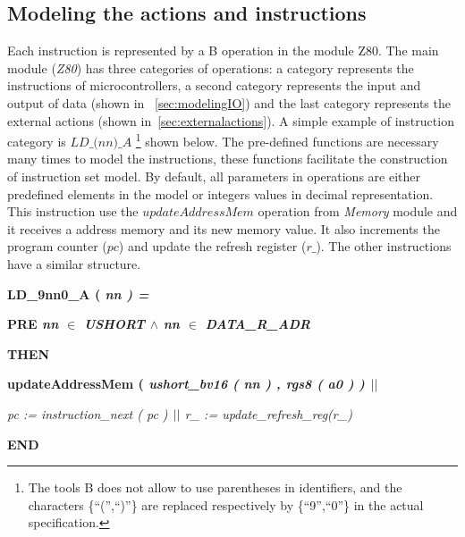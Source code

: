 \documentclass[a4paper]{llncs}
\newcommand{\footnoteremember}[2]{
  \footnote{#2}
  \newcounter{#1}
  \setcounter{#1}{\value{footnote}}
}
\begin{document}
\subsection{Modeling the actions and instructions}

Each instruction is represented by a B operation in the module Z80. The main
module (\textit{Z80}) has three categories of operations: a category represents the 
instructions of microcontrollers, a second category represents the input and output of data 
(shown in ~\ref{sec:modelingIO}) and the last category represents the external
actions (shown in~\ref{sec:externalactions}). A simple example of instruction category is
$\textit{LD\_(nn)\_A}$\footnoteremember{myfootnote}{The tools B does not allow
to use parentheses in identifiers, and the characters \{``('',``)''\} are
replaced respectively by \{``9'',``0''\} in the actual specification.} shown below. The
pre-defined functions are necessary many times to model the instructions, these
functions facilitate the construction of instruction set model. By default, all
parameters in operations are either predefined elements in the model or
integers values in decimal representation. This instruction use the
$\textit{updateAddressMem}$ operation from \textit{Memory} module and it receives
a address memory and its new memory value. It also increments the program
counter ($\textit{pc}$) and update the refresh register ($\textit{r\_}$).
The other instructions have a similar structure.

\hspace*{0.00in}\bf LD\_9nn0\_A \rm ( \it nn \rm ) \rm =

\hspace*{0.20in}\bf PRE \it nn $\in$ \it USHORT\hspace*{0.15in} $\land$ \hspace*{0.10in}\it nn\hspace*{0.10in} $\in$  \it DATA\_R\_ADR

\hspace*{0.20in}\bf THEN

\hspace*{0.20in}\bf updateAddressMem \rm ( \it ushort\_bv16 \rm ( \it nn \rm ) \rm , \it rgs8 \rm ( \it a0 \rm )
\rm )  $\mbox{$\mid\mid$}$

\hspace*{0.20in}\it pc \rm := \it instruction\_next \rm ( \it pc \rm )  $\mbox{$\mid\mid$}$  \it r\_ \rm := \it update\_refresh\_reg\rm (\it r\_\rm )

\hspace*{0.00in}\bf END\rm 
\end{document}
